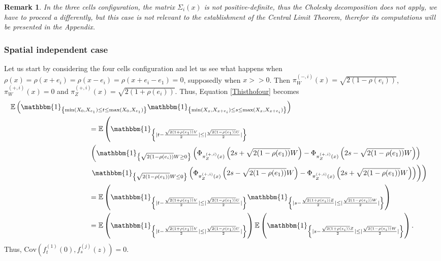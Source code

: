 \documentclass[12pt]{article}
\theoremstyle{Theorem}
\newtheorem{remark}{Remark}
\begin{document}
\begin{remark} In the three cells configuration, the matrix $\Sigma_{i}(x)$ is not positive-definite, thus the Cholesky decomposition does not apply, we have to proceed a differently, but this case is not relevant to the establishment of the Central Limit Theorem, therefor its computations will be presented in the Appendix.  
\end{remark}
\subsubsection{Spatial independent case} 
Let us start by considering the four cells configuration and let us see what happens when ${\rho(x) = \rho(x+e_i) = \rho(x-e_i) = \rho(x + e_i - e_1) = 0}$, supposedly when $x > > 0$. Then
$\pi^{\scriptscriptstyle(-, i)}_{W}(x) = \sqrt{2(1-\rho(e_i))}$, $\pi^{\scriptscriptstyle(+, i)}_{W}(x) = 0$ and $\pi^{\scriptscriptstyle(+, i)}_{Z}(x) = \sqrt{2(1+\rho(e_i))}.$ Thus, Equation \eqref{Thisthofour} becomes 
{\small
\begin{align*}
\mathbb{E}\left(\mathbbm{1}_{\left\{\min(X_{\scriptscriptstyle 0}, X_{e_1}) \leq t \leq \max(X_{\scriptscriptstyle 0}, X_{e_1})\right\}}\mathbbm{1}_{\left\{\min(X_{\scriptscriptstyle x}, X_{x+e_i}) \leq s \leq \max(X_{\scriptscriptstyle x}, X_{x+e_i}) \right\}}\right) \nonumber \\
& \hspace{-10cm} = \mathbb{E}\left(\mathbbm{1}_{\left\{ |t - \frac{\sqrt{2(1+\rho(e_1))}V}{2}| \leq |\frac{\sqrt{2(1-\rho(e_1))}U}{2}|\right\}} \right.  \\
& \left. \hspace{-10cm} \left(\mathbbm{1}_{\left\{\sqrt{2(1-\rho(e_i))}W \geq 0\right\}} \left(\Phi_{\pi^{\scriptscriptstyle(+, i)}_{Z}(x)}\left( 2s + \sqrt{2(1-\rho(e_1))} W\right) - \Phi_{\pi^{\scriptscriptstyle(+, i)}_{Z}(x)}\left(2s - \sqrt{2(1-\rho(e_1))} W\right)\right) \right. \right. \\
&  \hspace{-10cm} \left. \left. \mathbbm{1}_{\left\{\sqrt{2(1-\rho(e_1))} W  \leq 0\right\}} \left(\Phi_{\pi^{\scriptscriptstyle(+, i)}_{Z}(x)}\left( 2s - \sqrt{2(1-\rho(e_1))}W \right) - \Phi_{\pi^{\scriptscriptstyle(+, i)}_{Z}(x)}\left(2s + \sqrt{2(1-\rho(e_1))} W\right)\right)\right)\right)\\ 
& \hspace{-10cm} = \mathbb{E}\left(\mathbbm{1}_{\left\{ |t - \frac{\sqrt{2(1+\rho(e_1))}V}{2}| \leq |\frac{\sqrt{2(1-\rho(e_1))}U}{2}|\right\}}\mathbbm{1}_{\left\{ |s - \frac{\sqrt{2(1+\rho(e_i))}Z}{2}| \leq |\frac{\sqrt{2(1-\rho(e_i))}W}{2}|\right\}}\right) \\
& \hspace{-10cm} = \mathbb{E}\left(\mathbbm{1}_{\left\{ |t - \frac{\sqrt{2(1+\rho(e_1))}V}{2}| \leq |\frac{\sqrt{2(1-\rho(e_1))}U}{2}|\right\}}\right)\mathbb{E}\left(\mathbbm{1}_{\left\{ |s - \frac{\sqrt{2(1+\rho(e_i))}Z}{2}| \leq |\frac{\sqrt{2(1-\rho(e_i))}W}{2}|\right\}}\right).
\end{align*}
}Thus, $\text{Cov}\left(f_{t}^{\scriptscriptstyle (1)}(0), f_{s}^{ \scriptscriptstyle (j)}(z)\right) = 0.$
\end{document}
